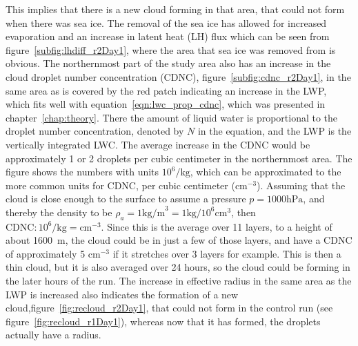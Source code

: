 This implies that there is a new cloud forming in that area, that could not form when there was sea ice. The removal of the sea ice has allowed for increased evaporation and an increase in latent heat (LH) flux which can be seen from figure~\ref{subfig:lhdiff_r2Day1}, where the area that sea ice was removed from is obvious. The northernmost part of the study area also has an increase in the cloud droplet number concentration (CDNC), figure~\ref{subfig:cdnc_r2Day1}, in the same area as is covered by the red patch indicating an increase in the LWP, which fits well with equation~\ref{eqn:lwc_prop_cdnc}, which was presented in chapter~\ref{chap:theory}. There the amount of liquid water is proportional to the droplet number concentration, denoted by $N$ in the equation, and the LWP is the vertically integrated LWC. The average increase in the CDNC would be approximately 1 or 2 droplets per cubic centimeter in the northernmost area. The figure shows the numbers with units $10^6/\text{kg}$, which can be approximated to the more common units for CDNC, per cubic centimeter ($\text{cm}^{-3}$). Assuming that the cloud is close enough to the surface to assume a pressure $p=1000\text{hPa}$, and thereby the density to be $\rho_a = 1\text{kg/m}^3=1\text{kg/}10^6\text{cm}^3$, then $\text{CDNC} : 10^6/\text{kg} = \text{cm}^{-3}$. Since this is the average over 11 layers, to a height of about 1600~m, the cloud could be in just a few of those layers, and have a CDNC of approximately 5 $\text{cm}^{-3}$ if it stretches over 3 layers for example. This is then a thin cloud, but it is also averaged over 24 hours, so the cloud could be forming in the later hours of the run. The increase in effective radius in the same area as the LWP is increased also indicates the formation of a new cloud,figure~\ref{fig:recloud_r2Day1}, that could not form in the control run (see figure~\ref{fig:recloud_r1Day1}), whereas now that it has formed, the droplets actually have a radius.

